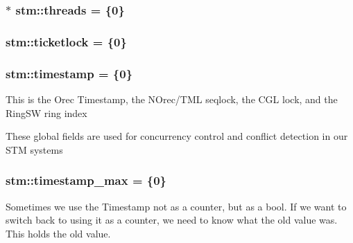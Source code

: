 \hypertarget{namespacestm_ab2acabe9f596fb07413e3a12fa14d570}{
\subsubsection[{threads}]{ $\ast$ stm\-::threads = \{0\}}}\label{namespacestm_ab2acabe9f596fb07413e3a12fa14d570}
\hypertarget{namespacestm_af262f754120f34d53b7aff4f3ee4e447}{
\subsubsection[{ticketlock}]{ stm\-::ticketlock = \{0\}}}\label{namespacestm_af262f754120f34d53b7aff4f3ee4e447}
\hypertarget{namespacestm_a8a8c42099bd04d1e89140ee02702f6e0}{
\subsubsection[{timestamp}]{ stm\-::timestamp = \{0\}}}\label{namespacestm_a8a8c42099bd04d1e89140ee02702f6e0}
This is the Orec Timestamp, the N\-Orec/\-T\-M\-L seqlock, the C\-G\-L lock, and the Ring\-S\-W ring index

These global fields are used for concurrency control and conflict detection in our S\-T\-M systems \hypertarget{namespacestm_a8d8dfb6b2b3438e3e104d5acbfbd7e71}{
\subsubsection[{timestamp\-\_\-max}]{ stm\-::timestamp\-\_\-max = \{0\}}}\label{namespacestm_a8d8dfb6b2b3438e3e104d5acbfbd7e71}
Sometimes we use the Timestamp not as a counter, but as a bool. If we want to switch back to using it as a counter, we need to know what the old value was. This holds the old value.

